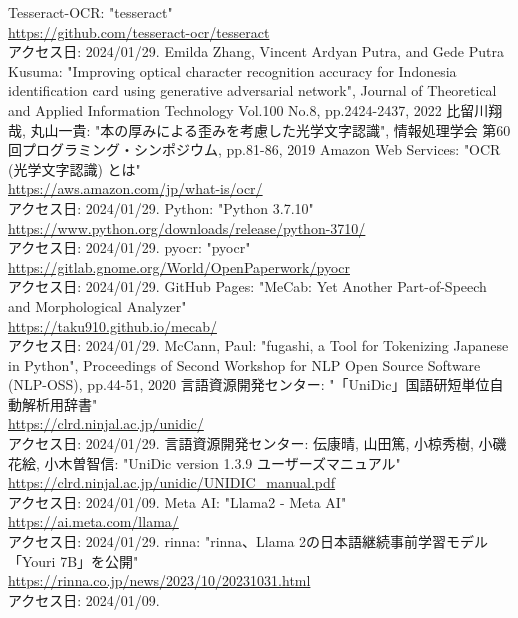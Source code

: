 \documentclass[uplatex, report, a4j, 10pt]{jsbook}
\begin{document}
\begin{thebibliography}{0}
  Tesseract-OCR: "tesseract"\\\url{https://github.com/tesseract-ocr/tesseract}\\アクセス日: 2024/01/29.
  Emilda Zhang,  Vincent Ardyan Putra, and Gede Putra Kusuma: "Improving optical character recognition accuracy for Indonesia identification card using generative adversarial network", Journal of Theoretical and Applied Information Technology Vol.100 No.8, pp.2424-2437, 2022
  比留川翔哉, 丸山一貴: "本の厚みによる歪みを考慮した光学文字認識", 情報処理学会 第60回プログラミング・シンポジウム, pp.81-86, 2019
  Amazon Web Services: "OCR (光学文字認識) とは"\\\url{https://aws.amazon.com/jp/what-is/ocr/}\\アクセス日: 2024/01/29.
  Python: "Python 3.7.10"\\\url{https://www.python.org/downloads/release/python-3710/}\\アクセス日: 2024/01/29.
  pyocr: "pyocr"\\\url{https://gitlab.gnome.org/World/OpenPaperwork/pyocr}\\アクセス日: 2024/01/29.
  GitHub Pages: "MeCab: Yet Another Part-of-Speech and Morphological Analyzer"\\\url{https://taku910.github.io/mecab/}\\アクセス日: 2024/01/29.
  McCann, Paul: "fugashi, a Tool for Tokenizing Japanese in Python", Proceedings of Second Workshop for NLP Open Source Software (NLP-OSS), pp.44-51, 2020
  言語資源開発センター: "「UniDic」国語研短単位自動解析用辞書"\\\url{https://clrd.ninjal.ac.jp/unidic/}\\アクセス日: 2024/01/29.
  言語資源開発センター: 伝康晴, 山田篤, 小椋秀樹, 小磯花絵, 小木曽智信: "UniDic version 1.3.9 ユーザーズマニュアル"\\\url{https://clrd.ninjal.ac.jp/unidic/UNIDIC_manual.pdf}\\アクセス日: 2024/01/09.
  Meta AI: "Llama2 - Meta AI"\\\url{https://ai.meta.com/llama/}\\アクセス日: 2024/01/29.
  rinna: "rinna、Llama 2の日本語継続事前学習モデル「Youri 7B」を公開"\\\url{https://rinna.co.jp/news/2023/10/20231031.html}\\アクセス日: 2024/01/09.

\end{thebibliography}
\end{document}
